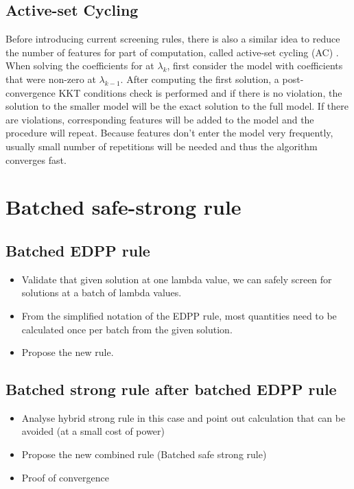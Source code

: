 \documentclass{article}
\begin{document}
\subsection{Active-set Cycling}

Before introducing current screening rules, there is also a similar idea to reduce the number of features for part of computation, called active-set cycling (AC) \cite{lee2007efficient}. When solving the coefficients for at $\lambda_k$, first consider the model with coefficients that were non-zero at $\lambda_{k-1}$. After computing the first solution, a post-convergence KKT conditions check is performed and if there is no violation, the solution to the smaller model will be the exact solution to the full model. If there are violations, corresponding features will be added to the model and the procedure will repeat. Because features don't enter the model very frequently, usually small number of repetitions will be needed and thus the algorithm converges fast.

\section{Batched safe-strong rule}
\label{sec:method}

\subsection{Batched EDPP rule}
\begin{itemize}
    \item Validate that given solution at one lambda value, we can safely screen for solutions at a batch of lambda values.
    \item From the simplified notation of the EDPP rule, most quantities need to be calculated once per batch from the given solution.
    \item Propose the new rule.
\end{itemize}

\subsection{Batched strong rule after batched EDPP rule}
\begin{itemize}
    \item Analyse hybrid strong rule in this case and point out calculation that can be avoided (at a small cost of power)
    \item Propose the new combined rule (Batched safe strong rule)
    \item Proof of convergence
\end{itemize}
\end{document}
